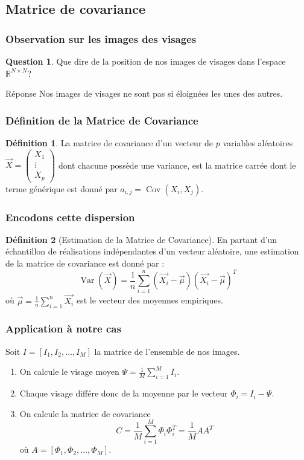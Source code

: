 \documentclass{beamer}
\theoremstyle{plain}
\theoremstyle{definition}
\newtheorem{defi}{Définition}
\newtheorem{qst}{Question}
\DeclareMathOperator\Var{Var}
\DeclareMathOperator\Cov{Cov}
\begin{document}
\subsection{Matrice de covariance}

\begin{frame}  
  \frametitle{Observation sur les images des visages}
  \begin{qst}
    Que dire de la position de nos images de visages dans l'espace $\mathbb{R}^{N \times N}$?
  \end{qst}
  \pause
  \begin{exampleblock}{Réponse}
    Nos images de visages ne sont pas si éloignées les unes des autres. 
  \end{exampleblock}
\end{frame}


\begin{frame}
  \frametitle{Définition de la Matrice de Covariance}  
  \begin{defi}
    La matrice de covariance d'un vecteur de $p$ variables aléatoires $\overrightarrow{X} =
    \begin{pmatrix}
      X_1 \\
      \vdots \\
      X_p
    \end{pmatrix}$ dont chacune possède une variance, est la matrice carrée dont le terme générique est donné par $a_{i,j} = \Cov(X_i,X_j)$.
  \end{defi}
\end{frame}


\begin{frame}
  \frametitle{Encodons cette dispersion}  
  \begin{defi}[Estimation de la Matrice de Covariance]
    En partant d’un échantillon de réalisations indépendantes d’un vecteur aléatoire, une estimation de la matrice de covariance est donné par :
    \[
      \Var(\overrightarrow{X}) = \frac{1}{n} \displaystyle\sum_{i=1}^{n} (\overrightarrow{X_i} - \overrightarrow{\mu})(\overrightarrow{X_i}-\overrightarrow{\mu})^T
    \]
    où $\overrightarrow{\mu} = \frac{1}{n} \displaystyle\sum_{i=1}^{n}\overrightarrow{X_i}$ est le vecteur des moyennes empiriques.
  \end{defi}
\end{frame}


\begin{frame}
  \frametitle{Application à notre cas}
  Soit $I = [I_1,I_2,\dotsc,I_M]$ la matrice de l'ensemble de nos images.
  \pause
  \begin{enumerate}
  \item On calcule le visage moyen $\Psi = \frac{1}{M}\displaystyle\sum_{i=1}^{M} I_i$.
    \pause
  \item Chaque visage différe donc de la moyenne par le vecteur $\Phi_i = I_i - \Psi$.
    \pause
  \item On calcule la matrice de covariance
    \[
      C = \frac{1}{M} \displaystyle\sum_{i=1}^{M} \Phi_i \Phi_i^T = \frac{1}{M} AA^T 
    \]
    où $A = [\Phi_1,\Phi_2,\dotsc,\Phi_M]$.    
  \end{enumerate}
\end{frame}
\end{document}
